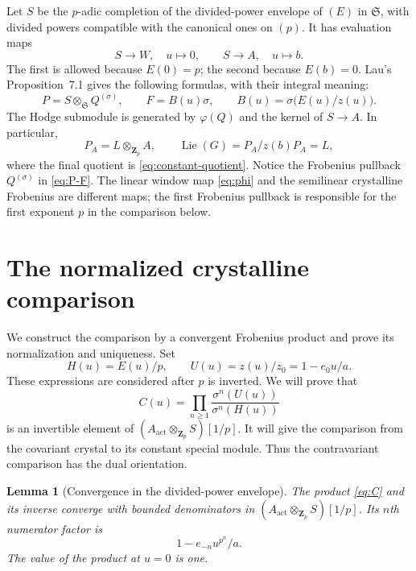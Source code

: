 \documentclass[11pt]{article}
\newtheorem{lemma}[theorem]{Lemma}
\theoremstyle{definition}\newtheorem{definition}[theorem]{Definition}
\theoremstyle{remark}\newtheorem{remark}[theorem]{Remark}
\newcommand{\ZZ}{\mathbf Z}
\newcommand{\Lie}{\operatorname{Lie}}
\newcommand{\act}{\mathrm{act}}
\begin{document}
Let $S$ be the $p$-adic completion of the divided-power envelope of $(E)$ in $\mathfrak S$, with divided powers compatible with the canonical ones on $(p)$. It has evaluation maps
\[
 S\longrightarrow W,\quad u\longmapsto0,
 \qquad
 S\longrightarrow A,\quad u\longmapsto b.
\]
The first is allowed because $E(0)=p$; the second because $E(b)=0$. Lau's Proposition~7.1 gives the following formulas, with their integral meaning:
\begin{equation}\label{eq:P-F}
 P=S\otimes_{\mathfrak S}Q^{(\sigma)},\qquad
 F=B(u)\sigma,\qquad B(u)=\sigma\bigl(E(u)/z(u)\bigr).
\end{equation}
The Hodge submodule is generated by $\varphi(Q)$ and the kernel of $S\to A$. In particular,
\begin{equation}\label{eq:Lie}
 P_A=L\otimes_{\ZZ_p}A,
 \qquad \Lie(G)=P_A/z(b)P_A=L,
\end{equation}
where the final quotient is \eqref{eq:constant-quotient}. Notice the Frobenius pullback $Q^{(\sigma)}$ in \eqref{eq:P-F}. The linear window map \eqref{eq:phi} and the semilinear crystalline Frobenius are different maps; the first Frobenius pullback is responsible for the first exponent $p$ in the comparison below.

\section{The normalized crystalline comparison}\label{sec:comparison}

We construct the comparison by a convergent Frobenius product and prove its normalization and uniqueness. Set
\begin{equation}\label{eq:HU}
 H(u)=E(u)/p,\qquad U(u)=z(u)/z_0=1-e_0u/a.
\end{equation}
These expressions are considered after $p$ is inverted. We will prove that
\begin{equation}\label{eq:C}
 C(u)=\prod_{n\ge1}\frac{\sigma^n(U(u))}{\sigma^n(H(u))}
\end{equation}
is an invertible element of $(A_{\act}\otimes_{\ZZ_p}S)[1/p]$. It will give the comparison from the covariant crystal to its constant special module. Thus the contravariant comparison has the dual orientation.

\begin{lemma}[Convergence in the divided-power envelope]\label{lem:convergence}
The product \eqref{eq:C} and its inverse converge with bounded denominators in $(A_{\act}\otimes_{\ZZ_p}S)[1/p]$. Its $n$th numerator factor is
\begin{equation}\label{eq:numerator-factor}
 1-e_{-n}u^{p^n}/a.
\end{equation}
The value of the product at $u=0$ is one.
\end{lemma}
\end{document}
